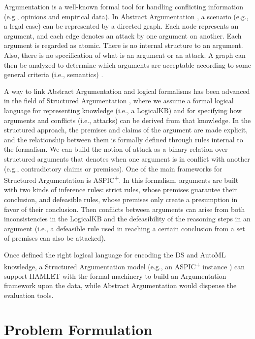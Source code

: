 Argumentation is a well-known formal tool for handling conflicting information (e.g., opinions and empirical data).
In Abstract Argumentation \cite{Dung1995abstractArg}, a scenario (e.g., a legal case) can be represented by a directed graph.
Each node represents an argument, and each edge denotes an attack by one argument on another. Each argument is regarded as atomic. There is no internal structure to an argument. Also, there is no specification of what is an argument or an attack. A graph can then be analyzed to determine which arguments are acceptable according to some general criteria (i.e., semantics) \cite{baroniCG11semantics}.

A way to link Abstract Argumentation and logical formalisms has been advanced in the field of Structured Argumentation \cite{BesnardGHMPST14structured}, where we assume a formal logical language for representing knowledge (i.e., a LogicalKB) and for specifying how arguments and conflicts (i.e., attacks) can be derived from that knowledge. 
In the structured approach, the premises and claims of the argument are made explicit, and the relationship between them is formally defined through rules internal to the formalism.
We can build the notion of attack as a binary relation over structured arguments that denotes when one argument is in conflict with another (e.g., contradictory claims or premises).
One of the main frameworks for Structured Argumentation is ASPIC\textsuperscript{+}\cite{Modgil2014aspic+}. 
In this formalism, arguments are built with two kinds of inference rules: strict rules, whose premises guarantee their conclusion, and defeasible rules, whose premises only create a presumption in favor of their conclusion. 
Then conflicts between arguments can arise from both inconsistencies in the LogicalKB and the defeasibility of the reasoning steps in an argument (i.e., a defeasible rule used in reaching a certain conclusion from a set of premises can also be attacked).

Once defined the right logical language for encoding the DS and AutoML knowledge, a Structured Argumentation model (e.g., an ASPIC\textsuperscript{+} instance \cite{arg2p-jlc}) can support HAMLET with the formal machinery to build an Argumentation framework upon the data, while Abstract Argumentation would dispense the evaluation tools.

\section{Problem Formulation}\label{sec:problem}

